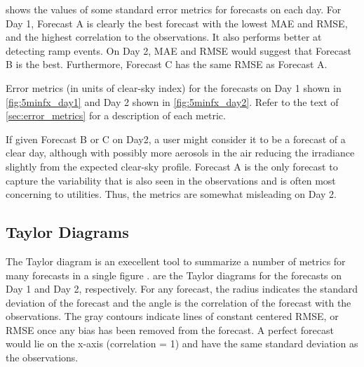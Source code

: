  shows the values of some standard error metrics
for forecasts on each day.
For Day 1, Forecast A is clearly the best forecast with the lowest
MAE and RMSE, and the highest correlation to the observations.
It also performs better at detecting ramp events.
On Day 2, MAE and RMSE would suggest that Forecast B is the best.
Furthermore, Forecast C has the same RMSE as Forecast A.

\begin{table}[htbp]
\centering
\caption[Error metrics for example forecasts]{Error metrics (in units
of clear-sky index) for the forecasts on Day 1 shown in
\cref{fig:5minfx_day1} and Day 2 shown in
\cref{fig:5minfx_day2}. Refer to the text of \cref{sec:error_metrics}
for a description of each metric.}
\label{table:fx_errs}
\vspace{.3em}
\captionsetup{position=top}
\hspace{3em}
\end{table}

If given Forecast B or C on Day2, a user might consider it to be a
forecast of a clear day, although with possibly more aerosols in the
air reducing the irradiance slightly from the expected clear-sky
profile.
Forecast A is the only forecast to capture the variability that is
also seen in the observations and is often most concerning to
utilities.
Thus, the metrics are somewhat misleading on Day 2.

\subsection{Taylor Diagrams}
The Taylor diagram is an execellent tool to summarize a number of
metrics for many forecasts in a single figure \citep{Taylor2001}.
 are the Taylor diagrams for the
forecasts on Day 1 and Day 2, respectively.
For any forecast, the radius indicates the standard deviation of the
forecast and the angle is the correlation of the forecast with the
observations.
The gray contours indicate lines of constant centered RMSE, or RMSE
once any bias has been removed from the forecast.
A perfect forecast would lie on the x-axis (correlation = 1) and have
the same standard deviation as the observations.

